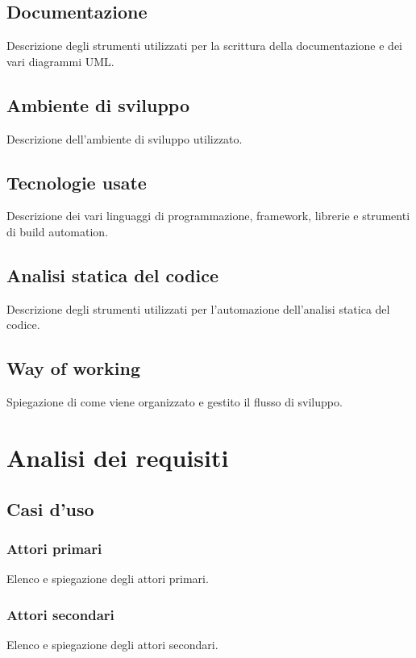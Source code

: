 \subsection{Documentazione}
Descrizione degli strumenti utilizzati per la scrittura della documentazione e dei vari diagrammi UML.

\subsection{Ambiente di sviluppo}
Descrizione dell'ambiente di sviluppo utilizzato.

\subsection{Tecnologie usate}
Descrizione dei vari linguaggi di programmazione, framework, librerie e strumenti di build automation.

\subsection{Analisi statica del codice}
Descrizione degli strumenti utilizzati per l'automazione dell'analisi statica del codice.

\subsection{Way of working}
Spiegazione di come viene organizzato e gestito il flusso di sviluppo.


\section{Analisi dei requisiti}

\subsection{Casi d'uso}

\subsubsection{Attori primari}
Elenco e spiegazione degli attori primari.

\subsubsection{Attori secondari}
Elenco e spiegazione degli attori secondari.

